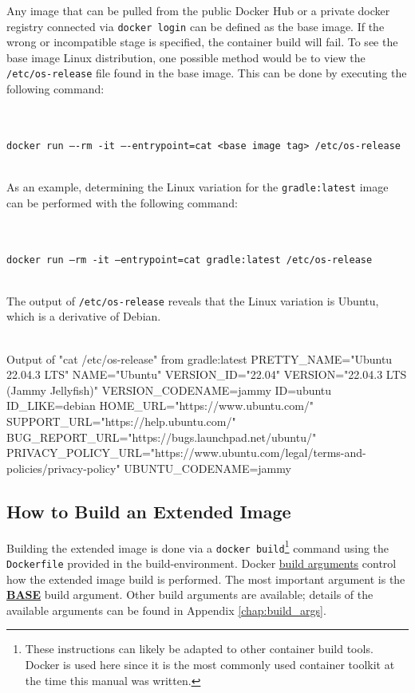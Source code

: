 Any image that can be pulled from the public Docker Hub or a private docker registry connected via 
\texttt{docker login} can be defined as the base image.  If the wrong or incompatible stage is specified, 
the container build will fail. To see the base image Linux distribution, one possible method would be
to view the \texttt{/etc/os-release} file found in the base image.  This can be done by executing the following
command:

\noindent\\\\\texttt{docker run ----rm -it ----entrypoint=cat <base image tag> /etc/os-release}


\noindent\\As an example, determining the Linux variation for the \texttt{gradle:latest} image can
be performed with the following command:

\noindent\\\\\texttt{docker run --rm -it --entrypoint=cat gradle:latest /etc/os-release}

\noindent\\The output of \texttt{/etc/os-release} reveals that the Linux variation is Ubuntu, which is a derivative
of Debian.\\\\

\begin{code}{Output of "cat /etc/os-release" from gradle:latest}{}{}
PRETTY_NAME="Ubuntu 22.04.3 LTS"
NAME="Ubuntu"
VERSION_ID="22.04"
VERSION="22.04.3 LTS (Jammy Jellyfish)"
VERSION_CODENAME=jammy
ID=ubuntu
ID_LIKE=debian
HOME_URL="https://www.ubuntu.com/"
SUPPORT_URL="https://help.ubuntu.com/"
BUG_REPORT_URL="https://bugs.launchpad.net/ubuntu/"
PRIVACY_POLICY_URL="https://www.ubuntu.com/legal/terms-and-policies/privacy-policy"
UBUNTU_CODENAME=jammy
\end{code}



\subsection{How to Build an Extended Image}

Building the extended image is done via a \texttt{docker build}\footnote{These instructions can likely be adapted to other container build tools.  Docker is used here since it is
the most commonly used container toolkit at the time this manual was written.} command
using the \texttt{Dockerfile} provided in the \cxtoolkit build-environment.
Docker \href{https://docs.docker.com/build/guide/build-args/}{build arguments} control how the extended image build
is performed.  The most important argument is the \hyperref[sec:BASE]{\textbf{BASE}} build argument.  Other build
arguments are available; details of the available arguments can be found in Appendix \ref{chap:build_args}.



